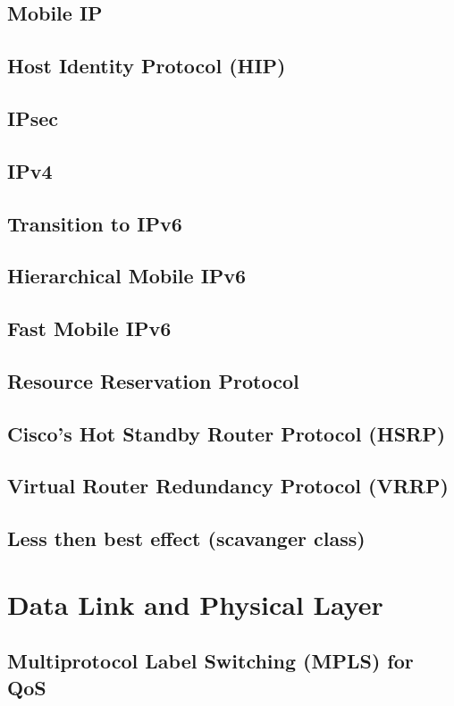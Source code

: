 \documentclass[journal]{IEEEtran}
\begin{document}
\subsection{Mobile IP}
\subsection{Host Identity Protocol (HIP)}
\subsection{IPsec}
\subsection{IPv4}
\subsection{Transition to IPv6}
\subsection{Hierarchical Mobile IPv6}
\subsection{Fast Mobile IPv6}
\subsection{Resource Reservation Protocol}
\subsection{Cisco's Hot Standby Router Protocol (HSRP)}
\subsection{Virtual Router Redundancy Protocol (VRRP)}
\subsection{Less then best effect (scavanger class)}

\section{Data Link and Physical Layer}

\subsection{ Multiprotocol Label Switching (MPLS) for QoS }
\end{document}
